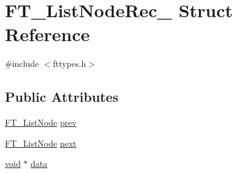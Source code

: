 \hypertarget{struct_f_t___list_node_rec__}{\section{F\-T\-\_\-\-List\-Node\-Rec\-\_\- Struct Reference}
\label{struct_f_t___list_node_rec__}
}


{\ttfamily \#include $<$fttypes.\-h$>$}

\subsection*{Public Attributes}
\begin{DoxyCompactItemize}
\item 
\hyperlink{fttypes_8h_a155e4980a42c16fbc221ad40b2b59695}{F\-T\-\_\-\-List\-Node} \hyperlink{struct_f_t___list_node_rec___a41c77950e6940b1b98e04709b705c046}{prev}
\item 
\hyperlink{fttypes_8h_a155e4980a42c16fbc221ad40b2b59695}{F\-T\-\_\-\-List\-Node} \hyperlink{struct_f_t___list_node_rec___a8275962fa8c92b77435cb4fa76251f39}{next}
\item 
\hyperlink{wglew_8h_aeea6e3dfae3acf232096f57d2d57f084}{void} $\ast$ \hyperlink{struct_f_t___list_node_rec___ab0202be88f722442a4bec9aeb5f6418f}{data}
\end{DoxyCompactItemize}


